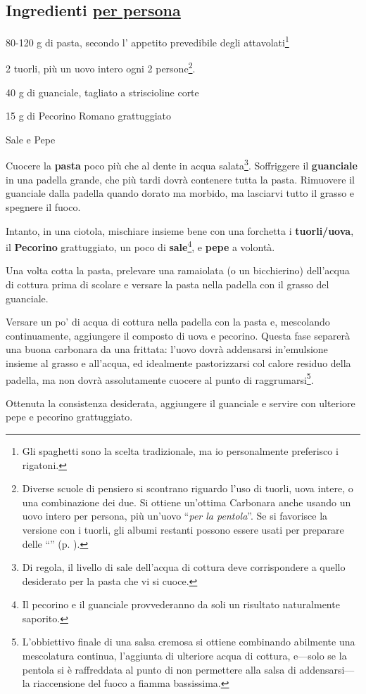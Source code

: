 \newpage
{}
\vspace*{-0.5 cm}

\subsection*{Ingredienti \underline{per persona}}
\begin{ingredients}
	\item 80-120 g di pasta, secondo l' appetito prevedibile degli attavolati\footnote{Gli spaghetti sono la scelta tradizionale, ma io personalmente preferisco i rigatoni.}
	\item 2 tuorli, più un uovo intero ogni 2 persone\footnote{Diverse scuole di pensiero si scontrano riguardo l'uso di tuorli, uova intere, o una combinazione dei due. Si ottiene un'ottima Carbonara anche usando un uovo intero per persona, più un'uovo ``\textit{per la pentola}''. Se si favorisce la versione con i tuorli, gli albumi restanti possono essere usati per preparare delle ``'' (p. \pageref{meringues}).}.
	\item 40 g di guanciale, tagliato a striscioline corte
	\item 15 g di Pecorino Romano grattuggiato
	\item Sale e Pepe
\end{ingredients}


\medskip

Cuocere la \textbf{pasta} poco più che al dente in acqua salata\footnote{Di regola, il livello di sale dell'acqua di cottura deve corrispondere a quello desiderato per la pasta che vi si cuoce.}.
Soffriggere il \textbf{guanciale} in una padella grande, che più tardi dovrà contenere tutta la pasta. 
Rimuovere il guanciale dalla padella quando dorato ma morbido, ma lasciarvi tutto il grasso e spegnere il fuoco.


Intanto, in una ciotola, mischiare insieme bene con una forchetta i \textbf{tuorli/uova}, il \textbf{Pecorino} grattuggiato, un poco di \textbf{sale}\footnote{Il pecorino e il guanciale provvederanno da soli un risultato naturalmente saporito.}, e \textbf{pepe} a volontà.

Una volta cotta la pasta, prelevare una ramaiolata (o un bicchierino) dell'acqua di cottura prima di scolare e versare la pasta nella padella con il grasso del guanciale. 

Versare un po' di acqua di cottura nella padella con la pasta e, mescolando continuamente, aggiungere il composto di uova e pecorino. 
Questa fase separerà una buona carbonara da una frittata: l'uovo dovrà addensarsi in'emulsione insieme al grasso e all'acqua, ed idealmente pastorizzarsi col calore residuo della padella, ma non dovrà assolutamente cuocere al punto di raggrumarsi\footnote{L'obbiettivo finale di una salsa cremosa si ottiene combinando abilmente una mescolatura continua, l'aggiunta di ulteriore acqua di cottura, e---solo se la pentola si è raffreddata al punto di non permettere alla salsa di addensarsi---la riaccensione del fuoco a fiamma bassissima.}. 

Ottenuta la consistenza desiderata, aggiungere il guanciale e servire con ulteriore pepe e pecorino grattuggiato.


\begin{recipeblock}
	
\end{recipeblock}
